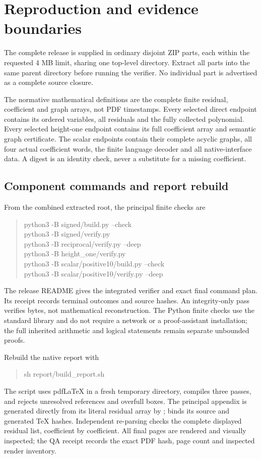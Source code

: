 \section{Reproduction and evidence boundaries}
\label{sec:verification}
The complete release is supplied in ordinary disjoint ZIP parts, each
within the requested 4 MB limit, sharing one top-level directory. Extract
all parts into the same parent directory before running the verifier.
No individual part is advertised as a complete source closure.

The normative mathematical definitions are the complete finite residual,
coefficient and graph arrays, not PDF timestamps. Every selected direct
endpoint contains its ordered variables, all residuals and the fully
collected polynomial. Every selected height-one endpoint contains its full
coefficient array and semantic graph certificate. The scalar endpoints
contain their complete acyclic graphs, all four actual coefficient words,
the finite language decoder and all native-interface data. A digest is
an identity check, never a substitute for a missing coefficient.

\subsection{Component commands and report rebuild}
From the combined extracted root, the principal finite checks are
\begin{quote}\ttfamily
python3 -B signed/build.py --check\\
python3 -B signed/verify.py\\
python3 -B reciprocal/verify.py --deep\\
python3 -B height\_one/verify.py\\
python3 -B scalar/positive10/build.py --check\\
python3 -B scalar/positive10/verify.py --deep
\end{quote}
The release README gives the integrated verifier and exact final command
plan. Its receipt records terminal outcomes and source hashes. An
integrity-only pass verifies bytes, not mathematical reconstruction.
The Python finite checks use the standard library and do not require a
network or a proof-assistant installation; the full inherited arithmetic
and logical statements remain separate unbounded proofs.

Rebuild the native report with
\begin{quote}\ttfamily
sh report/build\_report.sh
\end{quote}
The script uses pdfLaTeX in a fresh temporary directory, compiles three
passes, and rejects unresolved references and overfull boxes. The
principal appendix is generated directly from its literal residual array
by ; 
binds its source and generated TeX hashes. Independent re-parsing checks
the complete displayed residual list, coefficient by coefficient.
All final pages are rendered and visually inspected; the QA receipt
records the exact PDF hash, page count and inspected render inventory.

